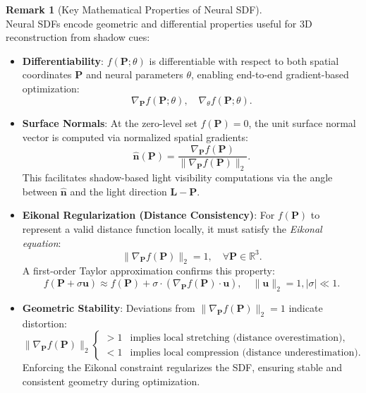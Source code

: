 \documentclass[12pt]{article}
\theoremstyle{definition}
\newtheorem{remark}{Remark}[subsection]
\begin{document}
\begin{remark}[Key Mathematical Properties of Neural SDF] \label{rmk:gradient_properties} ~\\
Neural SDFs encode geometric and differential properties useful for 3D reconstruction from shadow cues:
\begin{itemize}

    \item \textbf{Differentiability}: $f(\mathbf{P}; \theta)$ is differentiable with respect to both spatial coordinates $\mathbf{P}$ and neural parameters $\theta$, enabling end-to-end gradient-based optimization:
    \[
    \nabla_{\mathbf{P}} f(\mathbf{P}; \theta), \quad \nabla_{\theta} f(\mathbf{P}; \theta).
    \]
    
    \item \textbf{Surface Normals}: At the zero-level set $f(\mathbf{P}) = 0$, the unit surface normal vector is computed via normalized spatial gradients:
    \begin{equation}
    \hat{\mathbf{n}}(\mathbf{P}) = \frac{\nabla_{\mathbf{P}} f(\mathbf{P})}{\|\nabla_{\mathbf{P}} f(\mathbf{P})\|_2}. \label{eq:sdf_normal}
    \end{equation}
    This facilitates shadow-based light visibility computations via the angle between $\hat{\mathbf{n}}$ and the light direction $\mathbf{L} - \mathbf{P}$.

    \item \textbf{Eikonal Regularization (Distance Consistency)}: For $f(\mathbf{P})$ to represent a valid distance function locally, it must satisfy the \textit{Eikonal equation}:
    \begin{equation}
    \|\nabla_{\mathbf{P}} f(\mathbf{P})\|_2 = 1, \quad \forall \mathbf{P} \in \mathbb{R}^3. \label{eq:eikonal_constraint}
    \end{equation}
    A first-order Taylor approximation confirms this property:
    \begin{equation}
    f(\mathbf{P} + \sigma \mathbf{u}) \approx f(\mathbf{P}) + \sigma \cdot \left( \nabla_{\mathbf{P}} f(\mathbf{P}) \cdot \mathbf{u} \right), \quad \|\mathbf{u}\|_2 = 1, |\sigma| \ll 1. \label{eq:taylor_sdf_property}
    \end{equation}

    \item \textbf{Geometric Stability}: Deviations from $\|\nabla_{\mathbf{P}} f(\mathbf{P})\|_2 = 1$ indicate distortion:
    \[
    \|\nabla_{\mathbf{P}} f(\mathbf{P})\|_2
    \begin{cases}
    > 1 & \text{implies local stretching (distance overestimation)}, \\
    < 1 & \text{implies local compression (distance underestimation)}.
    \end{cases}
    \]
    Enforcing the Eikonal constraint regularizes the SDF, ensuring stable and consistent geometry during optimization.
    
\end{itemize}
\end{remark}
\end{document}
